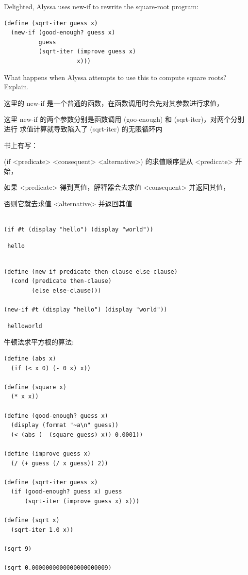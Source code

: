 \documentclass[11pt]{article}
\begin{document}
Delighted, Alyssa uses new-if to rewrite the square-root program:


\begin{verbatim}
(define (sqrt-iter guess x)
  (new-if (good-enough? guess x)
          guess
          (sqrt-iter (improve guess x)
                     x)))
\end{verbatim}

What happens when Alyssa attempts to use this to compute square roots? Explain.

这里的 new-if 是一个普通的函数，在函数调用时会先对其参数进行求值，

这里 new-if 的两个参数分别是函数调用 (goo-enough) 和 (sqrt-iter)，对两个分别进行
求值计算就导致陷入了 (sqrt-iter) 的无限循环内

书上有写：

(if <predicate> <consequent> <alternative>) 的求值顺序是从 <predicate> 开始，

如果 <predicate> 得到真值，解释器会去求值 <consequent> 并返回其值，

否则它就去求值 <alternative> 并返回其值


\begin{verbatim}

(if #t (display "hello") (display "world"))
\end{verbatim}

\begin{verbatim}
 hello
\end{verbatim}



\begin{verbatim}

(define (new-if predicate then-clause else-clause)
  (cond (predicate then-clause)
        (else else-clause)))

(new-if #t (display "hello") (display "world"))
\end{verbatim}

\begin{verbatim}
 helloworld
\end{verbatim}


牛顿法求平方根的算法:


\begin{verbatim}
(define (abs x)
  (if (< x 0) (- 0 x) x))

(define (square x)
  (* x x))

(define (good-enough? guess x)
  (display (format "~a\n" guess))
  (< (abs (- (square guess) x)) 0.0001))

(define (improve guess x)
  (/ (+ guess (/ x guess)) 2))

(define (sqrt-iter guess x)
  (if (good-enough? guess x) guess
      (sqrt-iter (improve guess x) x)))

(define (sqrt x)
  (sqrt-iter 1.0 x))

(sqrt 9)

(sqrt 0.0000000000000000000009)
\end{verbatim}
\end{document}
